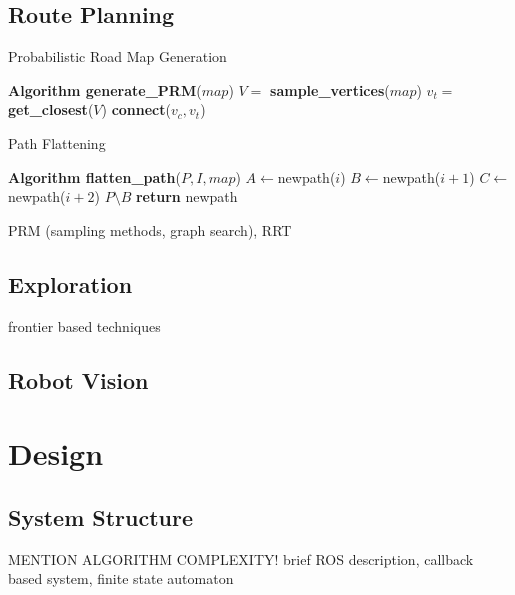 \documentclass[conference]{IEEEtran}
\begin{document}
\subsection{Route Planning}
\begin{algorithm}
  \caption{Probabilistic Road Map Generation}
  \label{alg:prm}
  \begin{algorithmic}[1]
    \State \textbf{Algorithm generate\_PRM}\textnormal{($map$)}
    \State $V = $\textbf{ sample\_vertices}\textnormal{($map$)}
    \State $v_t =$\textbf{ get\_closest}\textnormal{($V$)}
    \State \textbf{connect}\textnormal{($v_c, v_t$)}
    \EndIf
    \Else
    \EndIf
    \EndWhile
    \EndFor
  \end{algorithmic}
\end{algorithm}
\begin{algorithm}
  \caption{Path Flattening}
  \label{alg:pathflat}
  \begin{algorithmic}[1]
    \State \textbf{Algorithm flatten\_path}\textnormal{($P, I, map$)}
    \State $A \gets $\textnormal{newpath($i$)}
    \State $B \gets $\textnormal{newpath($i+1$)}
    \State $C \gets $\textnormal{newpath($i+2$)}
    \State $P\setminus B$
    \EndIf
    \EndFor
    \EndFor
    \State \textbf{return}\textnormal{ newpath}
  \end{algorithmic}
\end{algorithm}
PRM (sampling methods, graph search), RRT
\subsection{Exploration}
frontier based techniques
\subsection{Robot Vision}
\section{Design}
\subsection{System Structure}
MENTION ALGORITHM COMPLEXITY!
brief ROS description, callback based system, finite state automaton
\end{document}
